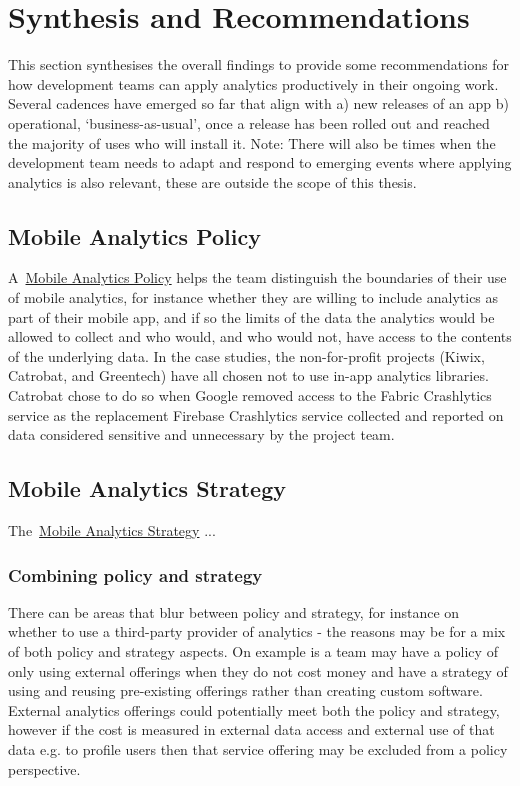 \section{Synthesis and Recommendations}
\label{section-synthesis-recommendations}

This section synthesises the overall findings to provide some recommendations for how development teams can apply analytics productively in their ongoing work. Several cadences have emerged so far that align with a) new releases of an app b) operational, `business-as-usual', once a release has been rolled out and reached the majority of uses who will install it. Note: There will also be times when the development team needs to adapt and respond to emerging events where applying analytics is also relevant, these are outside the scope of this thesis.

\subsection{Mobile Analytics Policy}
A~\href{glossary-mobile-analytics-policy}{Mobile Analytics Policy} helps the team distinguish the boundaries of their use of mobile analytics, for instance whether they are willing to include analytics as part of their mobile app, and if so the limits of the data the analytics would be allowed to collect and who would, and who would not, have access to the contents of the underlying data. In the case studies, the non-for-profit projects (Kiwix, Catrobat, and Greentech) have all chosen not to use in-app analytics libraries. Catrobat chose to do so when Google removed access to the Fabric Crashlytics service as the replacement Firebase Crashlytics service collected and reported on data considered sensitive and unnecessary by the project team.

\subsection{Mobile Analytics Strategy}
The~\href{glossary-mobile-analytics-strategy}{Mobile Analytics Strategy} ...

\subsubsection{Combining policy and strategy}
There can be areas that blur between policy and strategy, for instance on whether to use a third-party provider of analytics - the reasons may be for a mix of both policy and strategy aspects. On example is a team may have a policy of only using external offerings when they do not cost money and have a strategy of using and reusing pre-existing offerings rather than creating custom software. External analytics offerings could potentially meet both the policy and strategy, however if the cost is measured in external data access and external use of that data e.g. to profile users then that service offering may be excluded from a policy perspective.

